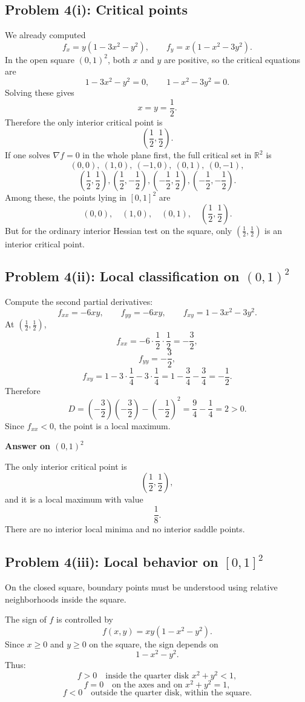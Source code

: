 \documentclass[11pt]{article}
\newenvironment{answerbox}[1]{\par\medskip\noindent\textcolor{linegreen}{\textbf{#1}}\par\smallskip}{\par\medskip}
\newcommand{\R}{\mathbb{R}}
\newcommand{\grad}{\nabla}
\begin{document}
\subsection*{Problem 4(i): Critical points}
We already computed
\[
f_x=y(1-3x^2-y^2),
\qquad
f_y=x(1-x^2-3y^2).
\]
In the open square $(0,1)^2$, both $x$ and $y$ are positive, so the critical equations are
\[
1-3x^2-y^2=0,
\qquad
1-x^2-3y^2=0.
\]
Solving these gives
\[
x=y=\frac12.
\]
Therefore the only interior critical point is
\[
\left(\frac12,\frac12\right).
\]
If one solves $\grad f=0$ in the whole plane first, the full critical set in $\R^2$ is
\[
(0,0),\ (1,0),\ (-1,0),\ (0,1),\ (0,-1),
\]
\[
\left(\frac12,\frac12\right),
\left(\frac12,-\frac12\right),
\left(-\frac12,\frac12\right),
\left(-\frac12,-\frac12\right).
\]
Among these, the points lying in $[0,1]^2$ are
\[
(0,0),
\quad (1,0),
\quad (0,1),
\quad \left(\frac12,\frac12\right).
\]
But for the ordinary interior Hessian test on the square, only $\left(\frac12,\frac12\right)$ is an interior critical point.

\subsection*{Problem 4(ii): Local classification on $(0,1)^2$}
Compute the second partial derivatives:
\[
f_{xx}=-6xy,
\qquad
f_{yy}=-6xy,
\qquad
f_{xy}=1-3x^2-3y^2.
\]
At $\left(\frac12,\frac12\right)$,
\[
f_{xx}=-6\cdot\frac12\cdot\frac12=-\frac32,
\]
\[
f_{yy}=-\frac32,
\]
\[
f_{xy}=1-3\cdot\frac14-3\cdot\frac14
=1-\frac34-\frac34
=-\frac12.
\]
Therefore
\[
D=\left(-\frac32\right)\left(-\frac32\right)-\left(-\frac12\right)^2
=\frac94-\frac14
=2>0.
\]
Since $f_{xx}<0$, the point is a local maximum.

\begin{answerbox}{Answer on $(0,1)^2$}
The only interior critical point is
\[
\left(\frac12,\frac12\right),
\]
and it is a local maximum with value
\[
\frac18.
\]
There are no interior local minima and no interior saddle points.
\end{answerbox}

\subsection*{Problem 4(iii): Local behavior on $[0,1]^2$}
On the closed square, boundary points must be understood using relative neighborhoods inside the square.

The sign of $f$ is controlled by
\[
f(x,y)=xy(1-x^2-y^2).
\]
Since $x\ge0$ and $y\ge0$ on the square, the sign depends on
\[
1-x^2-y^2.
\]
Thus:
\[
f>0\quad\text{inside the quarter disk }x^2+y^2<1,
\]
\[
f=0\quad\text{on the axes and on }x^2+y^2=1,
\]
\[
f<0\quad\text{outside the quarter disk, within the square.}
\]
\end{document}
